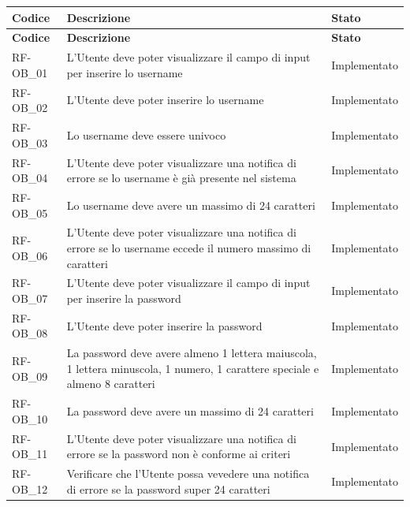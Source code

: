 \renewcommand{\arraystretch}{1.15}
\begin{longtable}{|>{\raggedright}p{}|>{\raggedright\arraybackslash}p{}|>{\raggedright\arraybackslash}p{}|}
	
	\hline
	\rowcolor[gray]{0.9}
	\textbf{Codice} & \textbf{Descrizione} & \textbf{Stato} \\
	\hline
	\endfirsthead
	
	\hline
	\rowcolor[gray]{0.9}
	\textbf{Codice} & \textbf{Descrizione} & \textbf{Stato}  \\
	\hline
	\endhead
	
	\hline
	RF-OB\_01 \hypertarget{rf-ob_1} & L'Utente deve poter visualizzare il campo di input per inserire lo username & Implementato \\
	\hline
	RF-OB\_02 \hypertarget{rf-ob_2} & L'Utente deve poter inserire lo username & Implementato \\
	\hline
	RF-OB\_03 \hypertarget{rf-ob_3} & Lo username deve essere univoco & Implementato \\
	\hline
	RF-OB\_04 \hypertarget{rf-ob_4} & L'Utente deve poter visualizzare una notifica di errore se lo username è già presente nel sistema & Implementato \\
	\hline
	RF-OB\_05 \hypertarget{rf-ob_5} & Lo username deve avere un massimo di 24 caratteri & Implementato \\
	\hline
	RF-OB\_06 \hypertarget{rf-ob_6} & L'Utente deve poter visualizzare una notifica di errore se lo username eccede il numero massimo di caratteri & Implementato \\
	\hline
	RF-OB\_07 \hypertarget{rf-ob_7} & L'Utente deve poter visualizzare il campo di input per inserire la password & Implementato \\
	\hline
	RF-OB\_08 \hypertarget{rf-ob_8} & L'Utente deve poter inserire la password & Implementato \\
	\hline
	RF-OB\_09 \hypertarget{rf-ob_9} & La password deve avere almeno 1 lettera maiuscola, 1 lettera minuscola, 1 numero, 1 carattere speciale e almeno 8 caratteri & Implementato \\
	\hline
	RF-OB\_10 \hypertarget{rf-ob_10} & La password deve avere un massimo di 24 caratteri & Implementato \\
	\hline
	RF-OB\_11 \hypertarget{rf-ob_11} & L'Utente deve poter visualizzare una notifica di errore se la password non è conforme ai criteri & Implementato \\
	\hline
	RF-OB\_12 \hypertarget{rf-ob_12} & Verificare che l’Utente possa vevedere una notifica di errore se la password super 24 caratteri  & Implementato \\

\end{longtable}
